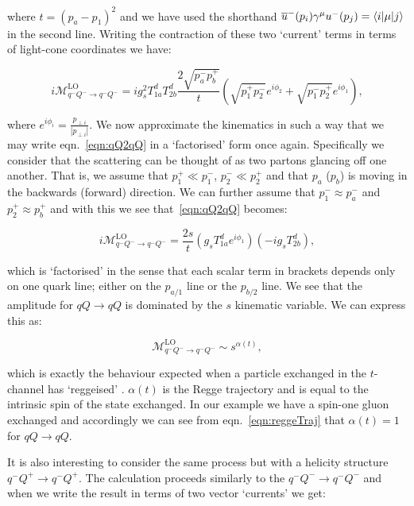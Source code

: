 	where $t = (p_a - p_1)^2$ and we have used the shorthand
	$\overline{u}^-(p_i)\gamma^\mu u^-(p_j) = \langle i | \mu | j \rangle$ in the second line.
	Writing the contraction of these two `current' terms in terms of light-cone coordinates we have:

	\begin{equation}
		i\mathcal{M}_{q^-Q^-\rightarrow q^-Q^-}^{\text{LO}} = ig_s^2T^d_{1a}T^d_{2b}
		\frac{2\sqrt{p_a^-p_b^+}}{t}
		\left(\sqrt{p_1^+p_2^-}e^{i\phi_2} + \sqrt{p_1^-p_2^+}e^{i\phi_1}\right),
		\label{eqn:qQ2qQ}
	\end{equation}

	where $e^{i\phi_i} = \frac{p_{\perp i}}{|p_{\perp i}|}$.  We now approximate the kinematics
	in such a way that we may write eqn.~\eqref{eqn:qQ2qQ} in a `factorised' form once again.
	Specifically we consider that the scattering can be thought of as two partons glancing off
	one another.  That is, we assume that $p_1^+\ll p_1^-$, $p_2^-\ll p_2^+$ and that $p_a$ ($p_b$)
	is moving in the backwards (forward) direction.  We can further assume that $p_1^-\approx p_a^-$
	and $p_2^+\approx p_b^+$ and with this we see that~\eqref{eqn:qQ2qQ} becomes:

	\begin{equation}
		i\mathcal{M}_{q^-Q^-\rightarrow q^-Q^-}^{\text{LO}} =
		\frac{2s}{t}\left(g_sT^d_{1a}e^{i\phi_1}\right)\left(-ig_sT^d_{2b}\right),
		\label{eqn:reggeTraj}
	\end{equation}

	which is `factorised' in the sense that each scalar term in brackets depends only on one
	quark line; either on the $p_{a/1}$ line or the $p_{b/2}$ line.  We see that the amplitude
	for $qQ\rightarrow qQ$ is dominated by the $s$ kinematic variable.  We can express this as:

	\begin{equation}
		\mathcal{M}_{q^-Q^-\rightarrow q^-Q^-}^{\text{LO}} \sim s^{\alpha(t)},
	\end{equation}

	which is exactly the behaviour expected when a particle exchanged in the $t$-channel has `reggeised'
	\cite{sabioThesis,DelDuca:1995hf,lipatovBook}.  $\alpha(t)$ is the Regge trajectory and is equal to
	the intrinsic spin of the state exchanged.  In our example we have a spin-one gluon exchanged
	and accordingly we can see from eqn.~\eqref{eqn:reggeTraj} that $\alpha(t)=1$ for $qQ\rightarrow qQ$.

	It is also interesting to consider the same process but with a helicity structure $q^-Q^+\to q^-Q^+$.
	The calculation proceeds similarly to the $q^-Q^-\to q^-Q^-$ and when we write the result in
	terms of two vector `currents' we get:

